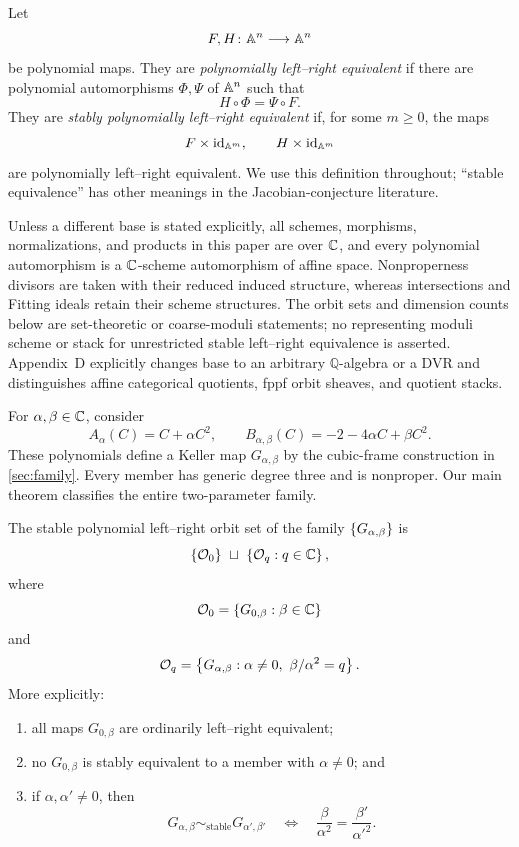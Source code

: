 \documentclass[11pt,reqno]{amsart}
\begin{document}
Let
\[
F,H\colon\mathbb A^n\longrightarrow\mathbb A^n
\]
be polynomial maps.  They are \emph{polynomially left--right equivalent} if
there are polynomial automorphisms \(\Phi,\Psi\) of \(\mathbb A^n\) such that
\[
H\circ\Phi=\Psi\circ F.
\]
They are \emph{stably polynomially left--right equivalent} if, for some
\(m\ge0\), the maps
\[
F\times\operatorname{id}_{\mathbb A^m},\qquad H\times\operatorname{id}_{\mathbb A^m}
\]
are polynomially left--right equivalent.  We use this definition throughout;
``stable equivalence'' has other meanings in the Jacobian-conjecture
literature.

Unless a different base is stated explicitly, all schemes, morphisms,
normalizations, and products in this paper are over \(\mathbb C\), and every
polynomial automorphism is a \(\mathbb C\)-scheme automorphism of affine space.
Nonproperness divisors are taken with their reduced induced structure,
whereas intersections and Fitting ideals retain their scheme structures.
The orbit sets and dimension counts below are set-theoretic or coarse-moduli
statements; no representing moduli scheme or stack for unrestricted stable
left--right equivalence is asserted.  Appendix~D explicitly changes base to
an arbitrary \(\mathbb Q\)-algebra or a DVR and distinguishes affine categorical
quotients, fppf orbit sheaves, and quotient stacks.

For \(\alpha,\beta\in\mathbb C\), consider
\begin{equation}
\label{eq:AB-general}
A_\alpha(C)=C+\alpha C^2,\qquad
B_{\alpha,\beta}(C)=-2-4\alpha C+\beta C^2.
\end{equation}
These polynomials define a Keller map \(G_{\alpha,\beta}\) by the cubic-frame
construction in \cref{sec:family}.  Every member has generic degree three
and is nonproper.  Our main theorem classifies the entire two-parameter
family.

\begin{theorem}
\label{thm:main}
The stable polynomial left--right orbit set of the family
\(\left\{G_{\alpha,\beta}\right\}\) is
\[
\left\{\mathcal O_0\right\}
\ \sqcup\
\left\{\mathcal O_q:q\in\mathbb C\right\},
\]
where
\[
\mathcal O_0=\left\{G_{0,\beta}:\beta\in\mathbb C\right\}
\]
and
\[
\mathcal O_q=
\left\{G_{\alpha,\beta}:
      \alpha\ne0,\ \beta/\alpha^2=q\right\}.
\]
More explicitly:
\begin{enumerate}[label=(\roman*)]
\item all maps \(G_{0,\beta}\) are ordinarily left--right equivalent;
\item no \(G_{0,\beta}\) is stably equivalent to a member with
      \(\alpha\ne0\); and
\item if \(\alpha,\alpha'\ne0\), then
\[
G_{\alpha,\beta}\sim_{\mathrm{stable}}G_{\alpha',\beta'}
\quad\Longleftrightarrow\quad
\frac{\beta}{\alpha^2}=\frac{\beta'}{\alpha'^2}.
\]
\end{enumerate}
\end{theorem}
\end{document}
